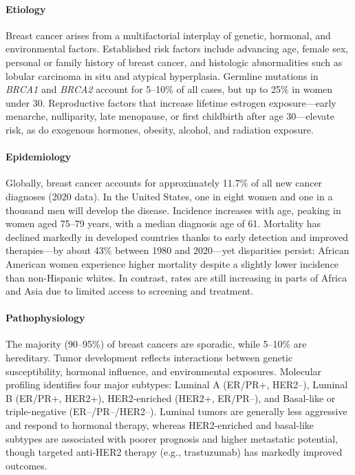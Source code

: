 \documentclass[10pt]{extarticle}
\begin{document}
\paragraph{Etiology}
Breast cancer arises from a multifactorial interplay of genetic, hormonal, and environmental factors. Established risk factors include advancing age, female sex, personal or family history of breast cancer, and histologic abnormalities such as lobular carcinoma in situ and atypical hyperplasia. Germline mutations in \textit{BRCA1} and \textit{BRCA2} account for 5–10\% of all cases, but up to 25\% in women under 30. Reproductive factors that increase lifetime estrogen exposure—early menarche, nulliparity, late menopause, or first childbirth after age 30—elevate risk, as do exogenous hormones, obesity, alcohol, and radiation exposure.

\paragraph{Epidemiology}
Globally, breast cancer accounts for approximately 11.7\% of all new cancer diagnoses (2020 data). In the United States, one in eight women and one in a thousand men will develop the disease. Incidence increases with age, peaking in women aged 75–79 years, with a median diagnosis age of 61. Mortality has declined markedly in developed countries thanks to early detection and improved therapies—by about 43\% between 1980 and 2020—yet disparities persist: African American women experience higher mortality despite a slightly lower incidence than non-Hispanic whites. In contrast, rates are still increasing in parts of Africa and Asia due to limited access to screening and treatment.

\paragraph{Pathophysiology}
The majority (90–95\%) of breast cancers are sporadic, while 5–10\% are hereditary. Tumor development reflects interactions between genetic susceptibility, hormonal influence, and environmental exposures. Molecular profiling identifies four major subtypes: Luminal A (ER/PR+, HER2–), Luminal B (ER/PR+, HER2+), HER2-enriched (HER2+, ER/PR–), and Basal-like or triple-negative (ER–/PR–/HER2–). Luminal tumors are generally less aggressive and respond to hormonal therapy, whereas HER2-enriched and basal-like subtypes are associated with poorer prognosis and higher metastatic potential, though targeted anti-HER2 therapy (e.g., trastuzumab) has markedly improved outcomes.
\end{document}

